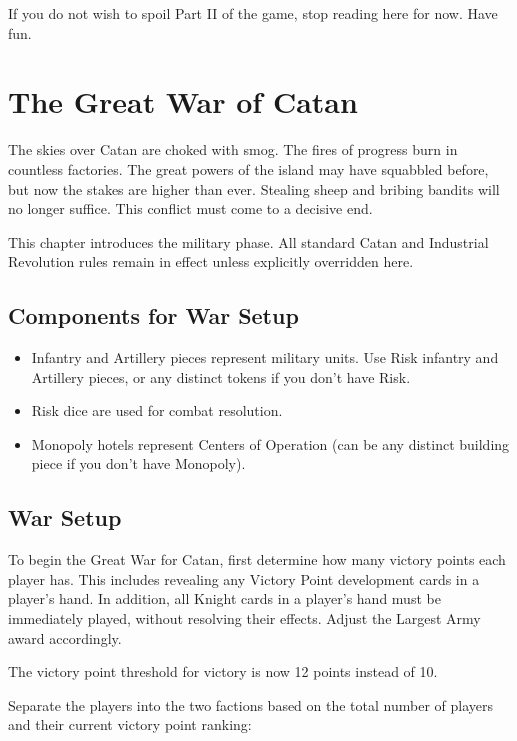\documentclass[12pt]{report}
\begin{document}
\begin{warningbox}
  If you do not wish to spoil Part II of the game, stop reading here for now. Have fun.
\end{warningbox}

\chapter{The Great War of Catan}

The skies over Catan are choked with smog. The fires of progress burn in countless factories. The great powers of the island may have squabbled before, but now the stakes are higher than ever. Stealing sheep and bribing bandits will no longer suffice. This conflict must come to a decisive end.

This chapter introduces the military phase. All standard Catan and Industrial Revolution rules remain in effect unless explicitly overridden here.

\section{Components for War Setup}
\begin{itemize}[leftmargin=1.2cm]
  \item Infantry and Artillery pieces represent military units. Use Risk infantry and Artillery pieces, or any distinct tokens if you don't have Risk.
  \item Risk dice are used for combat resolution.
  \item Monopoly hotels represent Centers of Operation (can be any distinct building piece if you don't have Monopoly).
\end{itemize}

\section{War Setup}
To begin the Great War for Catan, first determine how many victory points each player has. This includes revealing any Victory Point development cards in a player's hand. In addition, all Knight cards in a player's hand must be immediately played, without resolving their effects. Adjust the Largest Army award accordingly.

The victory point threshold for victory is now 12 points instead of 10.

Separate the players into the two factions based on the total number of players and their current victory point ranking:
\end{document}
